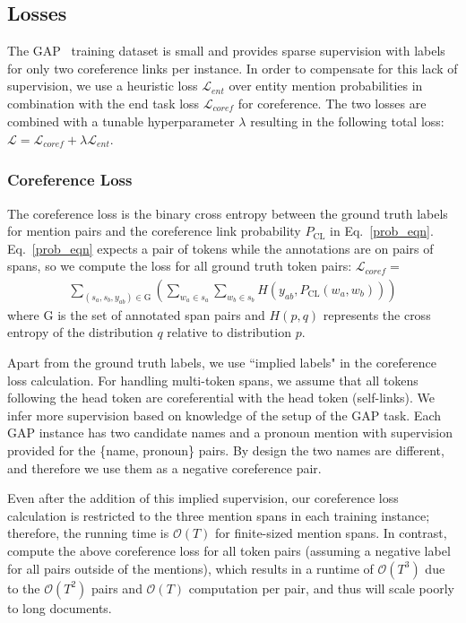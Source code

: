 \documentclass[11pt,a4paper]{article}
\begin{document}
\subsection{Losses}
The GAP~\cite{webster2018gap} training dataset is small and provides sparse supervision with labels for only two coreference links per instance.
In order to compensate for this lack of supervision, we use a heuristic loss $\mathcal{L}_{\mathit{ent}}$ over entity mention probabilities  in combination with the end task loss $\mathcal{L}_{\mathit{coref}}$ for coreference. The two losses are combined with a tunable hyperparameter $\lambda$ resulting in the following total loss: $\mathcal{L} = \mathcal{L}_{\mathit{coref}} + \lambda \mathcal{L}_{\mathit{ent}}$. 

\subsubsection{Coreference Loss}
\label{sec:coref_loss}
The coreference loss is the binary cross entropy between the ground truth labels for mention pairs and the coreference link probability $P_{\mathrm{CL}}$ in 
Eq.~\eqref{prob_eqn}. 
Eq.~\eqref{prob_eqn} expects 
a pair of tokens while the annotations are on pairs of spans, so we compute the loss for all ground truth token pairs: $\mathcal{L}_{\mathit{coref}} =$
\begin{align*}
    \sum_{(s_a, s_b, y_{ab}) \in {\mathrm{G}}} \left(\sum_{w_a \in s_a} \sum_{w_b \in s_b} H(y_{ab}, P_{\mathrm{CL}}(w_a, w_b))\right)
\end{align*}
where $\mathrm{G}$ is the set of annotated span pairs and $H(p, q)$ represents the cross entropy of the distribution $q$ relative to distribution $p$.

 
Apart from the ground truth labels, we use 
``implied labels" in the coreference loss calculation.
 For handling multi-token spans, we assume that all tokens following the head token are coreferential with the head token (self-links). 
 We infer more supervision based on knowledge of the setup of the GAP task. Each GAP instance has two candidate names and a pronoun mention with supervision provided for the \{name, pronoun\} pairs. By design the two names are different, and therefore we use them as a negative coreference pair.
 
 Even after the addition of this implied supervision, 
 our coreference loss calculation is restricted to the three mention spans in each training instance; therefore, the running time is $\mathcal{O}(T)$ for finite-sized mention spans. 
In contrast, \citet{liu2019referential} compute the above coreference loss for all token pairs (assuming a negative label for all pairs outside of the mentions), which results in a runtime of $\mathcal{O}(T^3)$ due to the   $\mathcal{O}(T^2)$ pairs and $\mathcal{O}(T)$ computation per pair, and thus will scale poorly to long documents.
\end{document}
